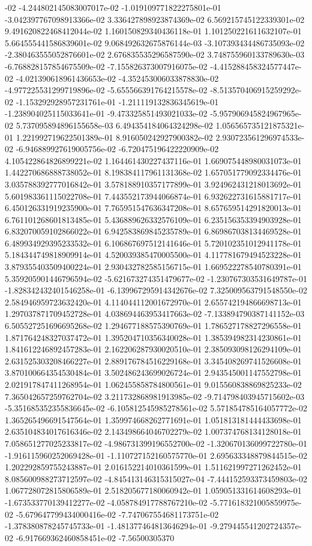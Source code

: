 -02	-4.244802145083007017e-02	-1.019109771822275801e-01	-3.042397767098913366e-02	3.336427898923874369e-02	6.569215745122339301e-02	9.491620822468412044e-02	1.160150829340436118e-01	1.101250221611632107e-01	5.664555441586839601e-02	9.068492632675876144e-03	-3.107393434486735093e-02	-2.380463555052876601e-02	2.676835535296587590e-02	3.748755960133789630e-03	-6.768828157854675509e-02	-7.155826373007916075e-02	-4.415288458324577447e-02	-4.021390618961436653e-02	-4.352453006033878830e-02	-4.977225531299719896e-02	-5.655566391764215578e-02	-8.513570406915259292e-02	-1.153292928957231761e-01	-1.211119132836345619e-01	-1.238904025115033641e-01	-9.473325851493021033e-02	-5.957906945824967965e-02	5.737095894896155658e-03	6.494354184064324298e-02	1.056565735121875321e-01	1.221992719622501389e-01	8.916050242927900382e-02	2.930723561296974533e-02	-6.946889927619005756e-02	-6.720475196422220909e-02	4.105422864826899221e-02	1.164461430227437116e-01	1.669075448980031073e-01	1.442270686888738052e-01	8.198384117961131368e-02	1.657051779092334476e-01	3.035788392777016842e-01	3.578188910357177899e-01	3.924962431218013692e-01	5.601983361115022708e-01	7.443552173944066874e-01	6.932622731615881717e-01	6.450126331919235900e-01	7.765951547636347208e-01	8.657659514291820013e-01	6.761101268601813485e-01	5.436889626332576109e-01	6.235156353394903928e-01	6.832070059102866022e-01	6.942583869845235789e-01	6.869867038134469528e-01	6.489934929395233532e-01	6.106867697512141646e-01	5.720102351012941178e-01	5.184344749818909914e-01	4.520039385470005500e-01	4.117781679494523228e-01	3.879355403509400224e-01	2.930432782585156715e-01	1.669522278540780391e-01	5.359205901446796594e-02	-5.621673274351479677e-02	-1.230767303531649787e-01	-1.828342432401546258e-01	-6.139967295914342676e-02	7.325009563791548550e-02	2.584946959723632420e-01	4.114044112001672970e-01	2.655742194866698713e-01	1.297037871709452728e-01	4.038694463953417663e-02	-7.133894790387141152e-03	6.505527251696695268e-02	1.294677188575390769e-01	1.786527178827296558e-01	1.871764248327037472e-01	1.395204710356340028e-01	1.385394982314230861e-01	1.841612246892457283e-01	2.162206287930020510e-01	2.385093098126294109e-01	2.631525303208466227e-01	2.889176784516229168e-01	3.345408269741526608e-01	3.870100664354530484e-01	3.502486243699026724e-01	2.943545001147552798e-01	2.021917847411268954e-01	1.062455858784800561e-01	9.015560838869825233e-02	7.365042657259762704e-02	3.211732868981913985e-02	-9.714798403945715602e-03	-5.351685352355836645e-02	-6.105812545985278561e-02	5.571854785164057772e-02	1.365265496691547564e-01	1.359974668262771691e-01	1.051813181444433698e-01	2.635104834017616346e-02	2.143498664046702279e-02	1.007374768134128018e-01	7.058651277025233817e-02	-4.986731399196552700e-02	-1.320670136099722780e-01	-1.916115960252069428e-01	-1.110727152160575770e-01	2.695633348879844515e-02	1.202292859755243887e-01	2.016152214010361599e-01	1.511621997271262452e-01	8.085600988273712597e-02	-4.845413146315315027e-04	-7.444152593373459803e-02	1.067728072815806589e-01	2.518205677180060942e-01	1.059051331614608293e-01	-1.673533770139412277e-02	-4.058784917788767210e-02	-5.771618321005859975e-02	-5.679647799434000416e-02	-7.747067554681173751e-02	-1.378380878245745733e-01	-1.481377464813646294e-01	-9.279445541202724357e-02	-6.917669362460858451e-02	-7.56500305370